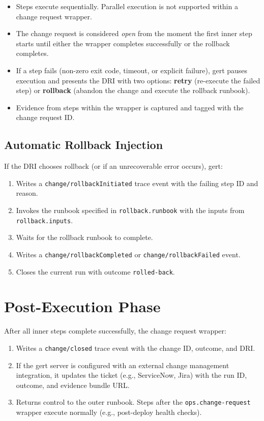 \begin{itemize}
  \item Steps execute sequentially. Parallel execution is not supported within a change
    request wrapper.
  \item The change request is considered \emph{open} from the moment the first inner step
    starts until either the wrapper completes successfully or the rollback completes.
  \item If a step fails (non-zero exit code, timeout, or explicit failure), gert pauses
    execution and presents the DRI with two options: \textbf{retry} (re-execute the failed
    step) or \textbf{rollback} (abandon the change and execute the rollback runbook).
  \item Evidence from steps within the wrapper is captured and tagged with the change request
    ID.
\end{itemize}

\subsection{Automatic Rollback Injection}

If the DRI chooses rollback (or if an unrecoverable error occurs), gert:
\begin{enumerate}
  \item Writes a \texttt{change/rollbackInitiated} trace event with the failing step ID and
    reason.
  \item Invokes the runbook specified in \texttt{rollback.runbook} with the inputs from
    \texttt{rollback.inputs}.
  \item Waits for the rollback runbook to complete.
  \item Writes a \texttt{change/rollbackCompleted} or \texttt{change/rollbackFailed} event.
  \item Closes the current run with outcome \texttt{rolled-back}.
\end{enumerate}

\section{Post-Execution Phase}
\label{sec:cr-post-execution}

After all inner steps complete successfully, the change request wrapper:
\begin{enumerate}
  \item Writes a \texttt{change/closed} trace event with the change ID, outcome, and DRI.
  \item If the gert server is configured with an external change management integration,
    it updates the ticket (e.g., ServiceNow, Jira) with the run ID, outcome, and evidence
    bundle URL.
  \item Returns control to the outer runbook. Steps after the \texttt{ops.change-request}
    wrapper execute normally (e.g., post-deploy health checks).
\end{enumerate}

